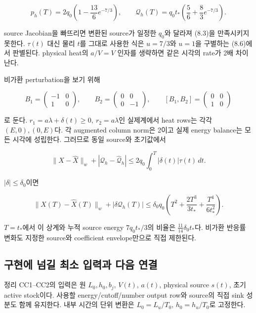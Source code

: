 \[
p_h(T)=2q_0\left(1-\frac{13}6e^{-7/3}\right),\qquad
\mathcal Q_h(T)=q_0t_*\left(\frac56+\frac83e^{-7/3}\right).
\tag{8.6}
\]

source Jacobian을 빠뜨리면 변환된 source가 일정한 \(q_0\)와 달라져 (8.3)을 만족시키지 못한다. \(\tau(t)\) 대신 물리 \(t\)를 그대로 사용한 식은 \(u=7/3\)와 \(u=1\)을 구별하는 (8.6)에서 판별된다. physical heat의 \(a/V=V\) 인자를 생략하면 같은 시각의 rate가 2배 차이난다.

비가환 perturbation을 보기 위해

\[
B_1=\begin{pmatrix}-1&0\\1&0\end{pmatrix},
\qquad
B_2=\begin{pmatrix}0&0\\0&-1\end{pmatrix},
\qquad
[B_1,B_2]=\begin{pmatrix}0&0\\1&0\end{pmatrix}
\tag{8.7}
\]

로 둔다. \(r_1=a\lambda+\delta(t)\ge0,\ r_2=a\lambda\)인 실제계에서 heat rows는 각각 \((E,0),(0,E)\)다. 각 augmented column norm은 2이고 실제 energy balance는 모든 시각에 성립한다. 그러므로 동일 source와 초기값에서

\[
\|X-\widehat X\|_w+
|\mathcal Q_h-\widehat{\mathcal Q}_h|
\le2q_0\int_0^T|\delta(t)|\tau(t)\,dt.
\tag{8.8}
\]

\(|\delta|\le\delta_0\)이면

\[
\boxed{
\|X(T)-\widehat X(T)\|_w+
|\delta\mathcal Q_h(T)|
\le\delta_0q_0
\left(T^2+\frac{2T^3}{3t_*}+\frac{T^4}{6t_*^2}\right).
}
\tag{8.9}
\]

\(T=t_*\)에서 이 상계와 누적 source energy \(7q_0t_*/3\)의 비율은 \(\frac{11}{14}\delta_0t_*\)다. 비가환 반응률 변화도 지정한 source와 coefficient envelope만으로 직접 제한된다.

\hypertarget{uxad6cuxd604uxc5d0-uxb118uxae38-uxcd5cuxc18c-uxc785uxb825uxacfc-uxb2e4uxc74c-uxc5f0uxacb0}{%
\subsection{구현에 넘길 최소 입력과 다음 연결}\label{uxad6cuxd604uxc5d0-uxb118uxae38-uxcd5cuxc18c-uxc785uxb825uxacfc-uxb2e4uxc74c-uxc5f0uxacb0}}

정리 CC1--CC2의 입력은 원 \(L_0,h_0,b_j\), \(V(t)\), \(a(t)\), physical source \(s(t)\), 초기 active stock이다. 사용할 energy/cutoff/number output row와 source의 직접 sink 성분도 함께 유지한다. 내부 시간의 단위 변환은 \(L_0=L_u/T_0\), \(h_0=h_u/T_0\)로 고정한다.

